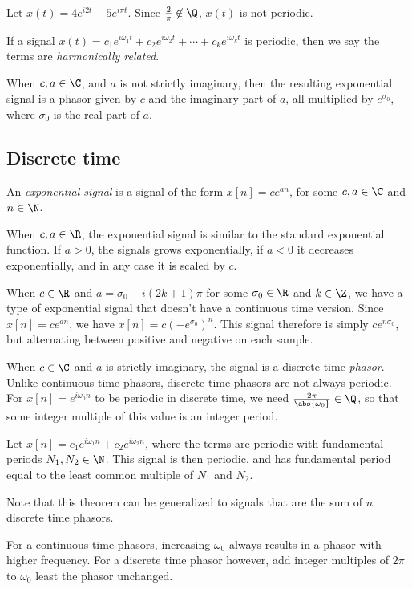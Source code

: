 \documentclass[12pt]{article}
\begin{document}
\begin{exmp}
    Let $x(t) = 4e^{i2t} - 5e^{i\pi t}$. Since $\frac{2}{\pi} \not\in \Q$, $x(t)$ is not periodic.
\end{exmp}

\begin{defn}
    If a signal $x(t) = c_1e^{i\omega_1t} + c_2e^{i\omega_2t} + \cdots + c_ke^{i\omega_kt}$ is periodic, then we say the terms are \emph{harmonically related}.
\end{defn}

When $c, a \in \C$, and $a$ is not strictly imaginary, then the resulting exponential signal is a phasor given by $c$ and the imaginary part of $a$, all multiplied by $e^{\sigma_0}$, where $\sigma_0$ is the real part of $a$.

\subsection{Discrete time}

\begin{defn}
    An \emph{exponential signal} is a signal of the form $x[n] = ce^{an}$, for some $c, a \in \C$ and $n \in \N$.
\end{defn}

When $c, a \in \R$, the exponential signal is similar to the standard exponential function. If $a > 0$, the signals grows exponentially, if $a < 0$ it decreases exponentially, and in any case it is scaled by $c$.

When $c \in \R$ and $a = \sigma_0 + i(2k+1)\pi$ for some $\sigma_0 \in \R$ and $k \in \Z$, we have a type of exponential signal that doesn't have a continuous time version. Since $x[n] = ce^{an}$, we have $x[n] = c\left(-e^{\sigma_0}\right)^n$. This signal therefore is simply $ce^{n\sigma_0}$, but alternating between positive and negative on each sample.

When $c \in \C$ and $a$ is strictly imaginary, the signal is a discrete time \emph{phasor}. Unlike continuous time phasors, discrete time phasors are not always periodic. For $x[n] = e^{i\omega_0n}$ to be periodic in discrete time, we need $\frac{2\pi}{\abs{\omega_0}} \in \Q$, so that some integer multiple of this value is an integer period.

\begin{thm}
    Let $x[n] = c_1e^{i\omega_1n} + c_2e^{i\omega_2n}$, where the terms are periodic with fundamental periods $N_1, N_2 \in \N$. This signal is then periodic, and has fundamental period equal to the least common multiple of $N_1$ and $N_2$.
\end{thm}

\begin{rmk}
    Note that this theorem can be generalized to signals that are the sum of $n$ discrete time phasors.
\end{rmk}

\begin{rmk}
    For a continuous time phasors, increasing $\omega_0$ always results in a phasor with higher frequency. For a discrete time phasor however, add integer multiples of $2\pi$ to $\omega_0$ least the phasor unchanged.
\end{rmk}
\end{document}
